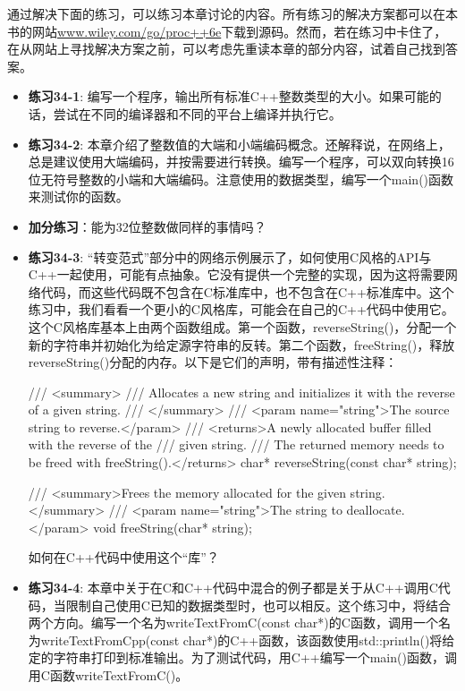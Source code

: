 通过解决下面的练习，可以练习本章讨论的内容。所有练习的解决方案都可以在本书的网站\url{www.wiley.com/go/proc++6e}下载到源码。然而，若在练习中卡住了，在从网站上寻找解决方案之前，可以考虑先重读本章的部分内容，试着自己找到答案。

\begin{itemize}
\item
\textbf{练习34-1}: 编写一个程序，输出所有标准C++整数类型的大小。如果可能的话，尝试在不同的编译器和不同的平台上编译并执行它。

\item
\textbf{练习34-2}: 本章介绍了整数值的大端和小端编码概念。还解释说，在网络上，总是建议使用大端编码，并按需要进行转换。编写一个程序，可以双向转换16位无符号整数的小端和大端编码。注意使用的数据类型，编写一个main()函数来测试你的函数。

\item
\textbf{加分练习}：能为32位整数做同样的事情吗？

\item
\textbf{练习34-3}: “转变范式”部分中的网络示例展示了，如何使用C风格的API与C++一起使用，可能有点抽象。它没有提供一个完整的实现，因为这将需要网络代码，而这些代码既不包含在C标准库中，也不包含在C++标准库中。这个练习中，我们看看一个更小的C风格库，可能会在自己的C++代码中使用它。这个C风格库基本上由两个函数组成。第一个函数，reverseString()，分配一个新的字符串并初始化为给定源字符串的反转。第二个函数，freeString()，释放reverseString()分配的内存。以下是它们的声明，带有描述性注释：

\begin{cpp}
/// <summary>
/// Allocates a new string and initializes it with the reverse of a given string.
/// </summary>
/// <param name="string">The source string to reverse.</param>
/// <returns>A newly allocated buffer filled with the reverse of the
/// given string.
/// The returned memory needs to be freed with freeString().</returns>
char* reverseString(const char* string);

/// <summary>Frees the memory allocated for the given string.</summary>
/// <param name="string">The string to deallocate.</param>
void freeString(char* string);
\end{cpp}

如何在C++代码中使用这个“库”？

\item
\textbf{练习34-4}: 本章中关于在C和C++代码中混合的例子都是关于从C++调用C代码，当限制自己使用C已知的数据类型时，也可以相反。这个练习中，将结合两个方向。编写一个名为writeTextFromC(const char*)的C函数，调用一个名为writeTextFromCpp(const char*)的C++函数，该函数使用std::println()将给定的字符串打印到标准输出。为了测试代码，用C++编写一个main()函数，调用C函数writeTextFromC()。
\end{itemize}
